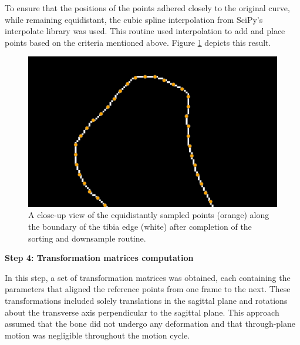 \documentclass{micro-econ-thesis}
\begin{document}
To ensure that the positions of the points adhered closely to the original curve, while remaining equidistant, the cubic spline interpolation from SciPy's interpolate library was used. This routine used interpolation to add and place points based on the criteria mentioned above. 
Figure \ref{fig:downsampled} depicts this result. 
\begin{figure}[H]
	\centering
	\includegraphics[width=0.7\linewidth]{downsampled}
	\caption{A close-up view of the equidistantly sampled points (orange) along the boundary of the tibia edge (white) after completion of the sorting and downsample routine. }
	\label{fig:downsampled}
\end{figure}

\textbf{Step 4: Transformation matrices computation}

In this step, a set of transformation matrices was obtained, each containing the parameters that aligned the reference points from one frame to the next. These transformations included solely translations in the sagittal plane and rotations about the transverse axis perpendicular to the sagittal plane. This approach assumed that the bone did not undergo any deformation and that through-plane motion was negligible throughout the motion cycle. 
\end{document}
